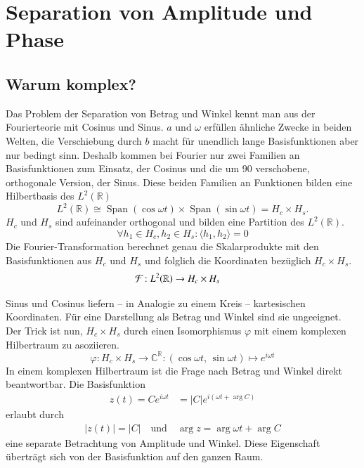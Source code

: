 \section{Separation von Amplitude und Phase}
\label{complex:separate}
\subsection{Warum komplex?}
Das Problem der Separation von Betrag und Winkel kennt man aus der Fourierteorie mit Cosinus und Sinus.
$a$ und $\omega$ erfüllen ähnliche Zwecke in beiden Welten, die Verschiebung durch $b$ macht für unendlich lange Basisfunktionen aber nur bedingt sinn.
Deshalb kommen bei Fourier nur zwei Familien an Basisfunktionen zum Einsatz, der Cosinus und die um 90\textdegree{} verschobene, orthogonale Version, der Sinus.
Diese beiden Familien an Funktionen bilden eine Hilbertbasis des $L^2(\mathbb{R})$
\[L^2(\mathbb{R}) \cong \mathop{\text{Span}}(\cos\omega t) \times \mathop{\text{Span}}(\sin\omega t) = H_c \times H_s.\]
$H_c$ und $H_s$ sind aufeinander orthogonal und bilden eine Partition des $L^2(\mathbb{R})$.
\[
\forall h_1 \in H_c, h_2 \in H_s: \langle h_1, h_2\rangle = 0
\]
Die Fourier-Transformation berechnet genau die Skalarprodukte mit den Basisfunktionen aus $H_c$ und $H_s$ und folglich die Koordinaten bezüglich $H_c\times H_s$.
\begin{align*}
	\Four : L^2(\mathbb{R}) &\to H_c \times H_s
\end{align*}

Sinus und Cosinus liefern -- in Analogie zu einem Kreis -- kartesischen Koordinaten. 
Für eine Darstellung als Betrag und Winkel sind sie ungeeignet.
Der Trick ist nun, $H_c \times H_s$ durch einen Isomorphismus $\varphi$ mit einem komplexen Hilbertraum zu asoziieren.
\[
	\varphi\colon H_c \times H_s \to \mathbb{C}^\mathbb{R} \colon
	(\cos\omega t,\, \sin\omega t) \mapsto e^{i\omega t}
\]
In einem komplexen Hilbertraum ist die Frage nach Betrag und Winkel direkt beantwortbar.
Die Basisfunktion
\begin{align*}
	z(t) = Ce^{i\omega t} &= |C|e^{i\left(\omega t + \arg C\right)}
\end{align*}
erlaubt durch 
\begin{align*}
	|z(t)| = |C| \quad \text{und}\quad
	\arg z = \arg \omega t + \arg C
\end{align*}
eine separate Betrachtung von Amplitude und Winkel.
Diese Eigenschaft überträgt sich von der Basisfunktion auf den ganzen Raum.

